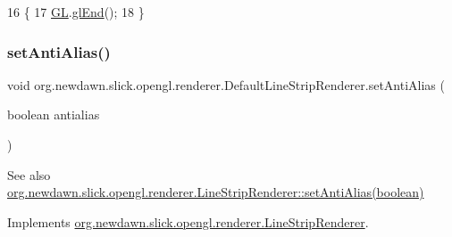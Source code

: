 \begin{DoxyCode}
16                       \{
17         \mbox{\hyperlink{classorg_1_1newdawn_1_1slick_1_1opengl_1_1renderer_1_1_default_line_strip_renderer_a8c4f5b0df77bf3a446d9d570f26e4171}{GL}}.\mbox{\hyperlink{interfaceorg_1_1newdawn_1_1slick_1_1opengl_1_1renderer_1_1_s_g_l_a7f5666aaa59b12617ab81e1263140f72}{glEnd}}();
18     \}
\end{DoxyCode}
\mbox{\label{classorg_1_1newdawn_1_1slick_1_1opengl_1_1renderer_1_1_default_line_strip_renderer_adec638ecbe7cb11adb68d6ad05e47940}} 
\subsubsection{\texorpdfstring{set\+Anti\+Alias()}{setAntiAlias()}}
{\footnotesize\ttfamily void org.\+newdawn.\+slick.\+opengl.\+renderer.\+Default\+Line\+Strip\+Renderer.\+set\+Anti\+Alias (\begin{DoxyParamCaption}\item[{boolean}]{antialias }\end{DoxyParamCaption})\hspace{0.3cm}{\ttfamily [inline]}}

\begin{DoxySeeAlso}{See also}
\mbox{\hyperlink{interfaceorg_1_1newdawn_1_1slick_1_1opengl_1_1renderer_1_1_line_strip_renderer_a849fde4a1b5b6981e77978bb3afa2b3b}{org.\+newdawn.\+slick.\+opengl.\+renderer.\+Line\+Strip\+Renderer\+::set\+Anti\+Alias(boolean)}} 
\end{DoxySeeAlso}


Implements \mbox{\hyperlink{interfaceorg_1_1newdawn_1_1slick_1_1opengl_1_1renderer_1_1_line_strip_renderer_a849fde4a1b5b6981e77978bb3afa2b3b}{org.\+newdawn.\+slick.\+opengl.\+renderer.\+Line\+Strip\+Renderer}}.


